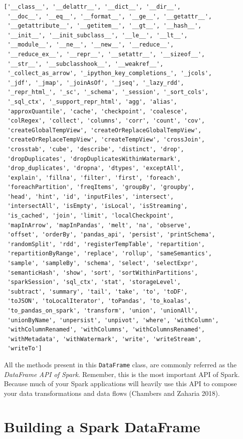 \documentclass[
  11pt,
  letterpaper,
  DIV=11,
  numbers=noendperiod]{scrreprt}
\begin{document}
\begin{verbatim}
['__class__', '__delattr__', '__dict__', '__dir__', 
 '__doc__', '__eq__', '__format__', '__ge__', '__getattr__', 
 '__getattribute__', '__getitem__', '__gt__', '__hash__', 
 '__init__', '__init_subclass__', '__le__', '__lt__', 
 '__module__', '__ne__', '__new__', '__reduce__', 
 '__reduce_ex__', '__repr__', '__setattr__', '__sizeof__', 
 '__str__', '__subclasshook__', '__weakref__', 
 '_collect_as_arrow', '_ipython_key_completions_', '_jcols', 
 '_jdf', '_jmap', '_joinAsOf', '_jseq', '_lazy_rdd', 
 '_repr_html_', '_sc', '_schema', '_session', '_sort_cols', 
 '_sql_ctx', '_support_repr_html', 'agg', 'alias', 
 'approxQuantile', 'cache', 'checkpoint', 'coalesce', 
 'colRegex', 'collect', 'columns', 'corr', 'count', 'cov', 
 'createGlobalTempView', 'createOrReplaceGlobalTempView', 
 'createOrReplaceTempView', 'createTempView', 'crossJoin', 
 'crosstab', 'cube', 'describe', 'distinct', 'drop', 
 'dropDuplicates', 'dropDuplicatesWithinWatermark', 
 'drop_duplicates', 'dropna', 'dtypes', 'exceptAll', 
 'explain', 'fillna', 'filter', 'first', 'foreach', 
 'foreachPartition', 'freqItems', 'groupBy', 'groupby', 
 'head', 'hint', 'id', 'inputFiles', 'intersect', 
 'intersectAll', 'isEmpty', 'isLocal', 'isStreaming', 
 'is_cached', 'join', 'limit', 'localCheckpoint', 
 'mapInArrow', 'mapInPandas', 'melt', 'na', 'observe', 
 'offset', 'orderBy', 'pandas_api', 'persist', 'printSchema', 
 'randomSplit', 'rdd', 'registerTempTable', 'repartition', 
 'repartitionByRange', 'replace', 'rollup', 'sameSemantics', 
 'sample', 'sampleBy', 'schema', 'select', 'selectExpr', 
 'semanticHash', 'show', 'sort', 'sortWithinPartitions', 
 'sparkSession', 'sql_ctx', 'stat', 'storageLevel', 
 'subtract', 'summary', 'tail', 'take', 'to', 'toDF', 
 'toJSON', 'toLocalIterator', 'toPandas', 'to_koalas', 
 'to_pandas_on_spark', 'transform', 'union', 'unionAll', 
 'unionByName', 'unpersist', 'unpivot', 'where', 'withColumn', 
 'withColumnRenamed', 'withColumns', 'withColumnsRenamed', 
 'withMetadata', 'withWatermark', 'write', 'writeStream', 
 'writeTo']
\end{verbatim}

All the methods present in this \texttt{DataFrame} class, are commonly
referred as the \emph{DataFrame API of Spark}. Remember, this is the
most important API of Spark. Because much of your Spark applications
will heavily use this API to compose your data transformations and data
flows (Chambers and Zaharia 2018).

\section{Building a Spark DataFrame}\label{sec-building-a-dataframe}
\end{document}
